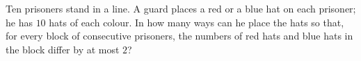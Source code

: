 Ten prisoners stand in a line. A guard places a red or a blue hat on each prisoner; he has $10$ hats of each colour. In how many ways can he place the hats so that, for every block of consecutive prisoners, the numbers of red hats and blue hats in the block differ by at most $2$?
